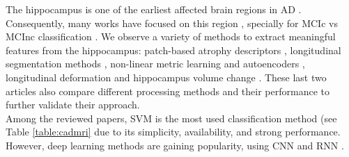 The hippocampus is one of the earliest affected brain regions in AD \cite{Ballard2011}. Consequently, many works have focused on this region \cite{chincarini,Shi2017}, specially for MCIc vs MCInc classification \cite{Fiot2014,Sanroma2017}. We observe a variety of methods to extract meaningful features from the hippocampus: patch-based atrophy descriptors \cite{Sanroma2017}, longitudinal segmentation methods \cite{Platero2019}, non-linear metric learning and autoencoders \cite{Shi2017}, longitudinal deformation \cite{Fiot2012,Fiot2014} and hippocampus volume change \cite{chincarini}. These last two articles also compare different processing methods and their performance to further validate their approach. \\ 

Among the reviewed papers, SVM is the most used classification method (see Table \ref{table:cadmri} due to its simplicity, availability, and strong performance. However, deep learning methods are gaining popularity, using CNN \cite{Ortiz2017} and RNN \cite{Ghazi2019,Cui2018}. \\

